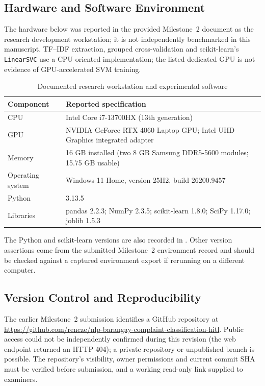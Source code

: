 \subsection{Hardware and Software Environment}
The hardware below was reported in the provided Milestone~2 document as the research development workstation; it is not independently benchmarked in this manuscript. TF--IDF extraction, grouped cross-validation and scikit-learn's \texttt{LinearSVC} use a CPU-oriented implementation; the listed dedicated GPU is not evidence of GPU-accelerated SVM training.
\begin{table}[H]\centering\caption{Documented research workstation and experimental software}\label{tab:m2env}\small\begin{tabularx}{\textwidth}{p{}X}\toprule
Component & Reported specification\\\midrule
CPU & Intel Core i7-13700HX (13th generation)\\
GPU & NVIDIA GeForce RTX 4060 Laptop GPU; Intel UHD Graphics integrated adapter\\
Memory & 16 GB installed (two 8 GB Samsung DDR5-5600 modules; 15.75 GB usable)\\
Operating system & Windows 11 Home, version 25H2, build 26200.9457\\
Python & 3.13.5\\
Libraries & pandas 2.2.3; NumPy 2.3.5; scikit-learn 1.8.0; SciPy 1.17.0; joblib 1.5.3\\\bottomrule
\end{tabularx}\end{table}
The Python and scikit-learn versions are also recorded in . Other version assertions come from the submitted Milestone~2 environment record and should be checked against a captured environment export if rerunning on a different computer.

\subsection{Version Control and Reproducibility}
The earlier Milestone~2 submission identifies a GitHub repository at \url{https://github.com/rencze/nlp-barangay-complaint-classification-hitl}. Public access could not be independently confirmed during this revision (the web endpoint returned an HTTP 404); a private repository or unpublished branch is possible. The repository's visibility, owner permissions and current commit SHA must be verified before submission, and a working read-only link supplied to examiners.

